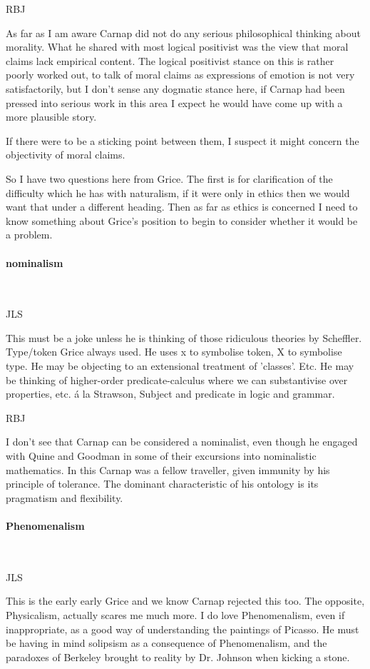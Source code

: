 \documentclass[10pt,titlepage]{book}
\begin{document}
RBJ

As far as I am aware Carnap did not do any serious philosophical thinking about morality.
What he shared with most logical positivist was the view that moral claims lack empirical content.
The logical positivist stance on this is rather poorly worked out, to talk of moral claims as expressions of emotion is not very satisfactorily, but I don't sense any dogmatic stance here, if Carnap had been pressed into serious work in this area I expect he would have come up with a more plausible story.

If there were to be a sticking point between them, I suspect it might concern the objectivity of moral claims.

So I have two questions here from Grice.
The first is for clarification of the difficulty which he has with naturalism, if it were only in ethics then we would want that under a different heading.
Then as far as ethics is concerned I need to know something about Grice's position to begin to consider whether it would be a problem. 

\paragraph{nominalism}\ 

JLS

This must be a joke unless he is thinking of those ridiculous  
theories by Scheffler. Type/token Grice always used. He uses x to symbolise  
token, X to symbolise type. He may be objecting to an extensional treatment 
of  'classes'. Etc. He may be thinking of higher-order predicate-calculus 
where we  can substantivise over properties, etc. \'a la Strawson, Subject and 
predicate in  logic and grammar.

RBJ

I don't see that Carnap can be considered a nominalist, even though he engaged with Quine and Goodman in some of their excursions into nominalistic mathematics.
In this Carnap was a fellow traveller, given immunity by his principle of tolerance.
The dominant characteristic of his ontology is its pragmatism and flexibility.

\paragraph{Phenomenalism}\ 

JLS

This is the early early Grice and we know Carnap rejected  
this too. The opposite, Physicalism, actually scares me much more. I do love  
Phenomenalism, even if inappropriate, as a good way of understanding the  
paintings of Picasso. He must be having in mind solipsism as a consequence of 
 Phenomenalism, and the paradoxes of Berkeley brought to reality by Dr. 
Johnson  when kicking a stone.
\end{document}
